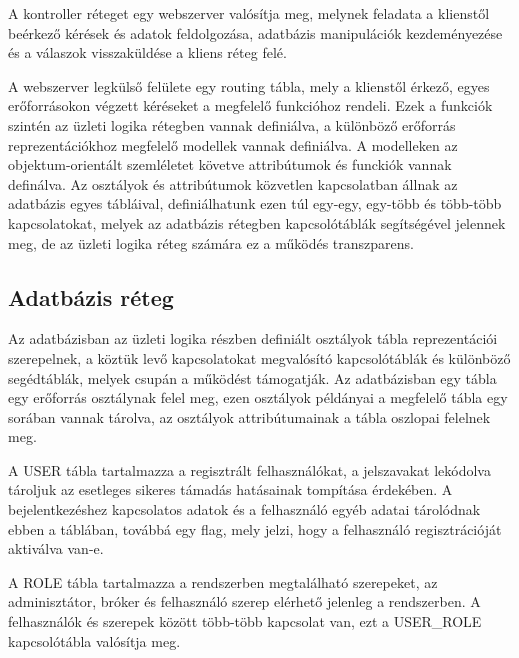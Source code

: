 A kontroller réteget egy webszerver valósítja meg, melynek feladata a klienstől beérkező kérések és adatok feldolgozása, adatbázis manipulációk kezdeményezése és a válaszok visszaküldése a kliens réteg felé.

\bigskip

A webszerver legkülső felülete egy routing tábla, mely a klienstől érkező, egyes erőforrásokon végzett kéréseket a megfelelő funkcióhoz rendeli. Ezek a funkciók szintén az üzleti logika rétegben vannak definiálva, a különböző erőforrás reprezentációkhoz megfelelő modellek vannak definiálva. A modelleken az objektum-orientált szemléletet követve attribútumok és funckiók vannak definálva. Az osztályok és attribútumok közvetlen kapcsolatban állnak az adatbázis egyes tábláival, definiálhatunk ezen túl egy-egy, egy-több és több-több kapcsolatokat, melyek az adatbázis rétegben kapcsolótáblák segítségével jelennek meg, de az üzleti logika réteg számára ez a működés transzparens.

\subsection{Adatbázis réteg}\label{sect:adatbazis_reteg}

Az adatbázisban az üzleti logika részben definiált osztályok tábla reprezentációi szerepelnek, a köztük levő kapcsolatokat megvalósító kapcsolótáblák és különböző segédtáblák, melyek csupán a működést támogatják. Az adatbázisban egy tábla egy erőforrás osztálynak felel meg, ezen osztályok példányai a megfelelő tábla egy sorában vannak tárolva, az osztályok attribútumainak a tábla oszlopai felelnek meg.

\bigskip

A USER tábla tartalmazza a regisztrált felhasználókat, a jelszavakat lekódolva tároljuk az esetleges sikeres támadás hatásainak tompítása érdekében. A bejelentkezéshez kapcsolatos adatok és a felhasználó egyéb adatai tárolódnak ebben a táblában, továbbá egy flag, mely jelzi, hogy a felhasználó regisztrációját aktiválva van-e.

\bigskip

A ROLE tábla tartalmazza a rendszerben megtalálható szerepeket, az adminisztátor, bróker és felhasználó szerep elérhető jelenleg a rendszerben. A felhasználók és szerepek között több-több kapcsolat van, ezt a USER\_ROLE kapcsolótábla valósítja meg. 

